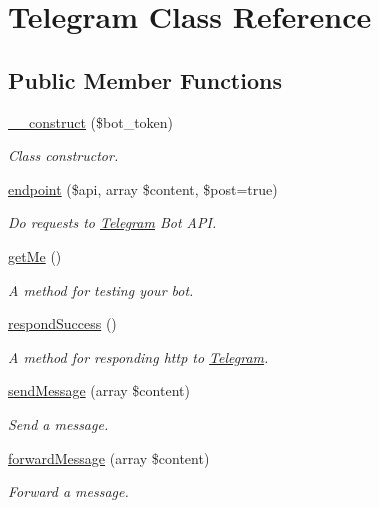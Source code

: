 \hypertarget{class_telegram}{\section{Telegram Class Reference}
\label{class_telegram}
}
\subsection*{Public Member Functions}
\begin{DoxyCompactItemize}
\item 
\hyperlink{class_telegram_a842b9e8c697b516945575dbcc0b335cb}{\-\_\-\-\_\-construct} (\$bot\-\_\-token)
\begin{DoxyCompactList}\small\item\em Class constructor. \end{DoxyCompactList}\item 
\hyperlink{class_telegram_a9241a37baf9b641df49a377c34bbdd59}{endpoint} (\$api, array \$content, \$post=true)
\begin{DoxyCompactList}\small\item\em Do requests to \hyperlink{class_telegram}{Telegram} Bot A\-P\-I. \end{DoxyCompactList}\item 
\hyperlink{class_telegram_a6bc057a9b0c03f8147a4294936b2494b}{get\-Me} ()
\begin{DoxyCompactList}\small\item\em A method for testing your bot. \end{DoxyCompactList}\item 
\hyperlink{class_telegram_aff3588359c3fa16dfa8e3f074086e7da}{respond\-Success} ()
\begin{DoxyCompactList}\small\item\em A method for responding http to \hyperlink{class_telegram}{Telegram}. \end{DoxyCompactList}\item 
\hyperlink{class_telegram_af1369d6caab77f71a051ab73fa642a3f}{send\-Message} (array \$content)
\begin{DoxyCompactList}\small\item\em Send a message. \end{DoxyCompactList}\item 
\hyperlink{class_telegram_aebf3d567e947a457971c1501be7fc1fe}{forward\-Message} (array \$content)
\begin{DoxyCompactList}\small\item\em Forward a message. \end{DoxyCompactList}\item 

\end{DoxyCompactItemize}
